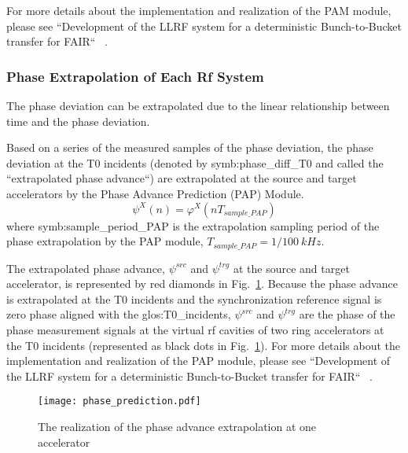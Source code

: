 For more details about the implementation and realization of the PAM module, please see ``Development of the LLRF system for a deterministic Bunch-to-Bucket transfer for FAIR`` ~\cite{ferrand_development_nodate}. 
\subsubsection{Phase Extrapolation of Each Rf System}
The phase deviation can be extrapolated due to the linear relationship between time and the phase deviation. 

Based on a series of the measured samples of the phase deviation, the phase deviation at the T0 incidents (denoted by \gls{symb:phase_diff_T0} and called the ``extrapolated phase advance``) are extrapolated at the source and target accelerators by the Phase Advance Prediction (\gls{PAP}) Module.
\begin{equation}
\label{extra_phase}
\psi^\mathit{X}(n)=\varphi^X(nT_\mathit{sample\_PAP})
\end{equation}
where \gls{symb:sample_period_PAP} is the extrapolation sampling period of the phase extrapolation by the PAP module, $T_\mathit{sample\_PAP}=1/\SI{100}{kHz}$.

The extrapolated phase advance, $\psi^\mathit{src}$ and $\psi^\mathit{trg}$ at the source and target accelerator, is represented by red diamonds in Fig.~\ref{phase_prediction1}. Because the phase advance is extrapolated at the T0 incidents and the synchronization reference signal is zero phase aligned with the \gls{glos:T0_incidents}, $\psi^\mathit{src}$ and $\psi^\mathit{trg}$ are the phase of the phase measurement signals at the virtual rf cavities of two ring accelerators at the T0 incidents (represented as black dots in Fig.~\ref{phase_prediction1}). For more details about the implementation and realization of the PAP module, please see ``Development of the LLRF system for a deterministic Bunch-to-Bucket transfer for FAIR`` ~\cite{ferrand_development_nodate}.   
\begin{figure}[!htb]
   \centering   
   \texttt{[image: phase\_prediction.pdf]}
   \caption{The realization of the phase advance extrapolation at one accelerator}
   \label{phase_prediction1}
\end{figure}
